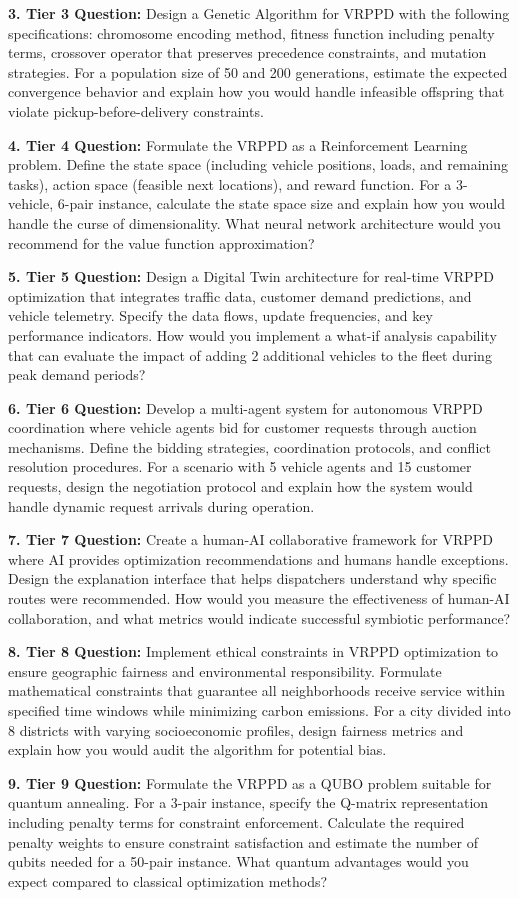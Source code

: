 \documentclass{article}
\begin{document}
\textbf{3. Tier 3 Question:} Design a Genetic Algorithm for VRPPD with the following specifications: chromosome encoding method, fitness function including penalty terms, crossover operator that preserves precedence constraints, and mutation strategies. For a population size of 50 and 200 generations, estimate the expected convergence behavior and explain how you would handle infeasible offspring that violate pickup-before-delivery constraints.

\textbf{4. Tier 4 Question:} Formulate the VRPPD as a Reinforcement Learning problem. Define the state space (including vehicle positions, loads, and remaining tasks), action space (feasible next locations), and reward function. For a 3-vehicle, 6-pair instance, calculate the state space size and explain how you would handle the curse of dimensionality. What neural network architecture would you recommend for the value function approximation?

\textbf{5. Tier 5 Question:} Design a Digital Twin architecture for real-time VRPPD optimization that integrates traffic data, customer demand predictions, and vehicle telemetry. Specify the data flows, update frequencies, and key performance indicators. How would you implement a what-if analysis capability that can evaluate the impact of adding 2 additional vehicles to the fleet during peak demand periods?

\textbf{6. Tier 6 Question:} Develop a multi-agent system for autonomous VRPPD coordination where vehicle agents bid for customer requests through auction mechanisms. Define the bidding strategies, coordination protocols, and conflict resolution procedures. For a scenario with 5 vehicle agents and 15 customer requests, design the negotiation protocol and explain how the system would handle dynamic request arrivals during operation.

\textbf{7. Tier 7 Question:} Create a human-AI collaborative framework for VRPPD where AI provides optimization recommendations and humans handle exceptions. Design the explanation interface that helps dispatchers understand why specific routes were recommended. How would you measure the effectiveness of human-AI collaboration, and what metrics would indicate successful symbiotic performance?

\textbf{8. Tier 8 Question:} Implement ethical constraints in VRPPD optimization to ensure geographic fairness and environmental responsibility. Formulate mathematical constraints that guarantee all neighborhoods receive service within specified time windows while minimizing carbon emissions. For a city divided into 8 districts with varying socioeconomic profiles, design fairness metrics and explain how you would audit the algorithm for potential bias.

\textbf{9. Tier 9 Question:} Formulate the VRPPD as a QUBO problem suitable for quantum annealing. For a 3-pair instance, specify the Q-matrix representation including penalty terms for constraint enforcement. Calculate the required penalty weights to ensure constraint satisfaction and estimate the number of qubits needed for a 50-pair instance. What quantum advantages would you expect compared to classical optimization methods?
\end{document}
